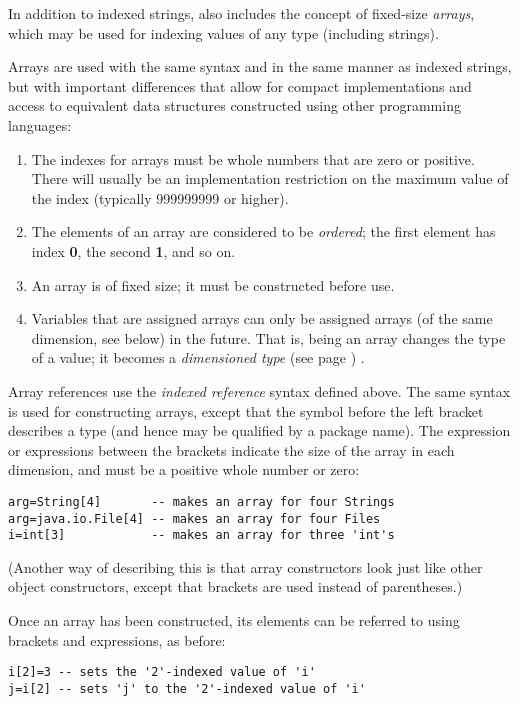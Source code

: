 In addition to indexed strings, \nr{} also includes the concept of
fixed-size \emph{arrays}, which may be used for indexing values of any
type (including strings).
 
Arrays are used with the same syntax and in the same manner as
indexed strings, but with important differences that allow for
compact implementations and access to equivalent data structures
constructed using other programming languages:
\begin{enumerate}
\item 
The indexes for arrays must be whole numbers that are zero or positive.
There will usually be an implementation restriction on the maximum value
of the index (typically 999999999 or higher).
\item 
The elements of an array are considered to be \emph{ordered}; the
first element has index \textbf{0}, the second \textbf{1}, and so on.
\item 
An array is of fixed size;
it must be constructed before use.
\item 
Variables that are assigned arrays can only be assigned arrays (of the
same dimension, see below) in the future.  That is, being an array
changes the type of a value; it becomes a
 \emph{dimensioned type} (see page \pageref{refdimtype}) .
\end{enumerate}
 
Array references use the \nr{} \emph{indexed reference} syntax
defined above.  The same syntax is used for constructing arrays, except
that the symbol before the left bracket describes a type (and hence may
be qualified by a package name).  The expression or expressions between
the brackets indicate the size of the array in each dimension, and must
be a positive whole number or zero:
\begin{lstlisting}
arg=String[4]       -- makes an array for four Strings
arg=java.io.File[4] -- makes an array for four Files
i=int[3]            -- makes an array for three 'int's
\end{lstlisting}

(Another way of describing this is that array constructors look
just like other object constructors, except that brackets are
used instead of parentheses.)
 
Once an array has been constructed, its elements can be referred to
using brackets and expressions, as before:
\begin{lstlisting}
i[2]=3 -- sets the '2'-indexed value of 'i'
j=i[2] -- sets 'j' to the '2'-indexed value of 'i'
\end{lstlisting}
 
